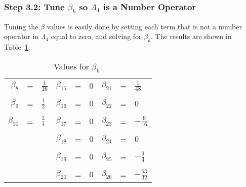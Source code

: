 \documentclass{article}
\begin{document}
\subsubsection{Step 3.2: Tune $\beta_{k}$ so $\Lambda_{4}$ is a Number Operator}

Tuning the $\beta$ values is easily done by setting each term that is not a number operator in $\Lambda_{4}$ equal to zero, and solving for $\beta_{k}$.  The results are shown in Table~\ref{tabSolvedBetaValues}.

\begin{table}[!hp]
\begin{center}
\begin{tabular}{rclrclrcl}
 $\beta_{8}$  & = & $ \frac{1}{16} $        & $\beta_{15}$ & = & $ 0            $ & $\beta_{21}$ & = & $ \frac{1}{48}   $ \\
              &   &                         &              &   &                  &              &   &                    \\
 $\beta_{9}$  & = & $ \frac{1}{2}  $        & $\beta_{16}$ & = & $ 0            $ & $\beta_{22}$ & = & $ 0              $ \\
              &   &                         &              &   &                  &              &   &                    \\
 $\beta_{10}$ & = & $ \frac{3}{4}  $        & $\beta_{17}$ & = & $ 0            $ & $\beta_{23}$ & = & $ -\frac{9}{16}  $ \\
              &   &                         &              &   &                  &              &   &                    \\
              &   &                         & $\beta_{18}$ & = & $ 0            $ & $\beta_{24}$ & = & $ 0              $ \\
              &   &                         &              &   &                  &              &   &                    \\
              &   &                         & $\beta_{19}$ & = & $ 0            $ & $\beta_{25}$ & = & $ -\frac{9}{4}   $ \\
              &   &                         &              &   &                  &              &   &                    \\
              &   &                         & $\beta_{20}$ & = & $ 0            $ & $\beta_{26}$ & = & $ -\frac{63}{32} $ \\
\end{tabular}
\caption{Values for $\beta_{k}$. \label{tabSolvedBetaValues}}
\end{center}
\end{table}
\end{document}
